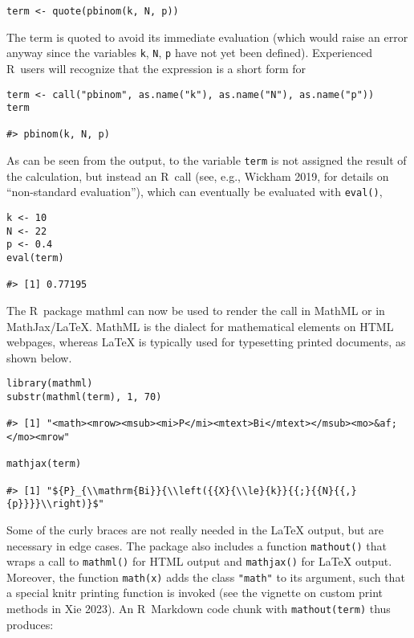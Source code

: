 \begin{verbatim}
term <- quote(pbinom(k, N, p))
\end{verbatim}

The term is quoted to avoid its immediate evaluation (which would raise
an error anyway since the variables \texttt{k}, \texttt{N}, \texttt{p} have not yet been
defined). Experienced R~users will recognize that the expression is a
short form for

\begin{verbatim}
term <- call("pbinom", as.name("k"), as.name("N"), as.name("p"))
term

#> pbinom(k, N, p)
\end{verbatim}

As can be seen from the output, to the variable \texttt{term} is not assigned
the result of the calculation, but instead an R~call (see, e.g., Wickham 2019,
for details on ``non-standard evaluation''), which can eventually be
evaluated with \texttt{eval()},

\begin{verbatim}
k <- 10
N <- 22
p <- 0.4
eval(term)

#> [1] 0.77195
\end{verbatim}

The R~package mathml can now be used to render the call in MathML or in
MathJax/LaTeX. MathML is the dialect for mathematical elements on HTML
webpages, whereas LaTeX is typically used for typesetting printed
documents, as shown below.

\begin{verbatim}
library(mathml)
substr(mathml(term), 1, 70)

#> [1] "<math><mrow><msub><mi>P</mi><mtext>Bi</mtext></msub><mo>&af;</mo><mrow"

mathjax(term)

#> [1] "${P}_{\\mathrm{Bi}}{\\left({{X}{\\le}{k}}{{;}{{N}{{,}{p}}}}\\right)}$"
\end{verbatim}

Some of the curly braces are not really needed in the LaTeX output, but
are necessary in edge cases. The package also includes a function
\texttt{mathout()} that wraps a call to \texttt{mathml()} for HTML output and
\texttt{mathjax()} for LaTeX output. Moreover, the function \texttt{math(x)} adds the
class \texttt{"math"} to its argument, such that a special knitr printing
function is invoked (see the vignette on custom print methods in Xie 2023).
An R~Markdown code chunk with \texttt{mathout(term)} thus produces:

